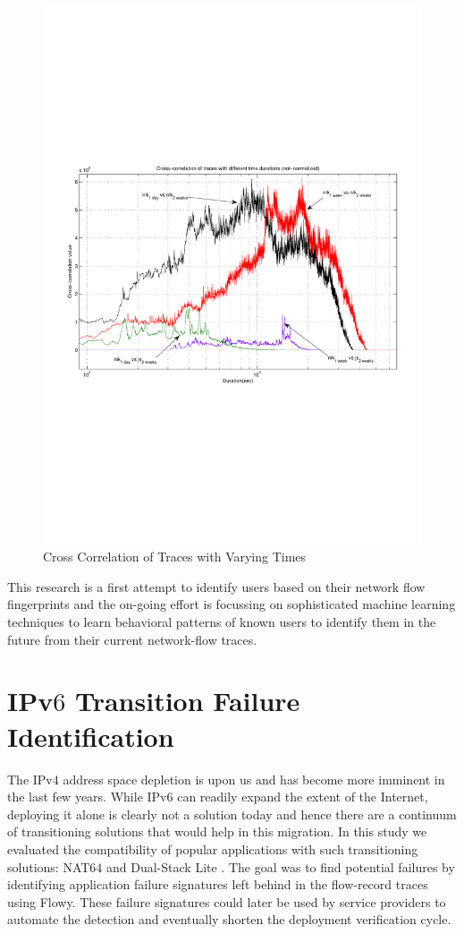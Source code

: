 \begin{figure}[h!]
\begin{center}
  \includegraphics* [width=0.6\linewidth]{figures/cybermetrics-cross-correlate}	
  \caption{Cross Correlation of Traces with Varying Times 
					 \cite{nmelnikov:thesis:2010}}
  \label{fig:cybermetrics-cross-correlate}
\end{center}
\end{figure}

This research is a first attempt to identify users based on their network flow fingerprints and the on-going effort is focussing on sophisticated machine learning techniques to learn behavioral patterns of known users to identify them in the future from their current network-flow traces.

\section{IPv$6$ Transition Failure Identification}\label{sec:ipv6transeval}
The IPv$4$ address space depletion is upon us and has become more imminent in the last few years. While IPv$6$ can readily expand the extent of the Internet, deploying it alone is clearly not a solution today and hence there are a continuum of transitioning solutions that would help in this migration. In this study \cite{vbajpai:2012} we evaluated the compatibility of popular applications with such transitioning solutions: NAT$64$ \cite{rfc6146} and Dual-Stack Lite \cite{rfc6333}. The goal was to find potential failures by identifying application failure signatures left behind in the flow-record traces using Flowy. These failure signatures could later be used by service providers to automate the detection and eventually shorten the deployment verification cycle.

